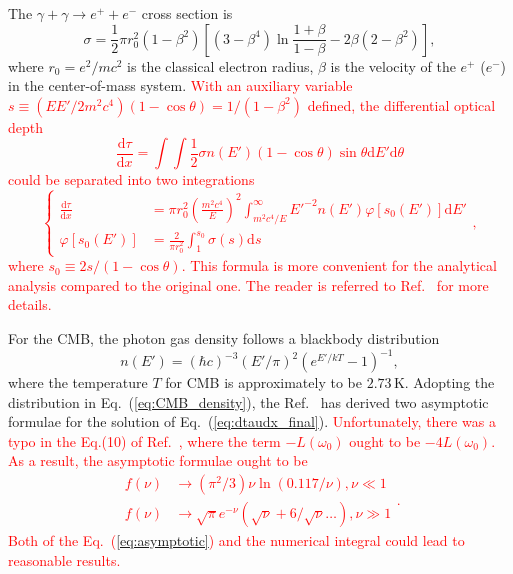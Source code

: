 \documentclass[12pt,aps,prd,amsmath,amssymb,showpacs,floats,floatfix,nofootinbib]{revtex4-1}
\def\red#1{{\textcolor{red}{#1}}} %
\begin{document}
The $\gamma+\gamma\rightarrow e^++e^-$ cross section is
\begin{equation}
  \sigma = \frac{1}{2}\pi r_0^2(1-\beta^2)\left[ (3-\beta^4)\ln\frac{1+\beta}{1-\beta}-2\beta(2-\beta^2) \right],
  \label{eq:cross_section}
\end{equation}
where $r_0=e^2/mc^2$ is the classical electron radius, $\beta$ is the velocity of the $e^+$ ($e^-$)  in the center-of-mass system.
\red{
  With an auxiliary variable $s\equiv (EE'/2m^2c^4)(1-\cos\theta)=1/(1-\beta^2)$ defined, the differential optical depth
\begin{equation}
  \frac{\mathrm{d}\tau}{\mathrm{d}x}=\int\int\frac{1}{2}\sigma n(E')(1-\cos\theta)\sin\theta\mathrm{d}E'\mathrm{d}\theta
  \label{eq:dtaudx}
\end{equation}
could be separated into two integrations
  \begin{equation}
    \left\{
      \begin{aligned}
        \frac{\mathrm{d}\tau}{\mathrm{d}x}&=\pi r_0^2\left( \frac{m^2c^4}{E} \right)^2\int^\infty_{m^2c^4/E}E'^{-2}n(E')\varphi\left[ s_0(E') \right]\mathrm{d}E'\\
        \varphi\left[ s_0(E') \right] &= \frac{2}{\pi r_0^2}\int_{1}^{s_0}\sigma(s)\mathrm{d}s
    \end{aligned}\right.,
  \label{eq:dtaudx_final}
  \end{equation}
  where $s_0\equiv 2s/(1-\cos\theta)$. This formula is more convenient for the analytical analysis compared to the original one. The reader is referred to Ref.~\cite{Gould:1967zzb} for more details.
}

For the CMB, the photon gas density follows a blackbody distribution
\begin{equation}
  n(E') = (\hbar c)^{-3}(E'/\pi)^2\left( e^{E'/kT}-1 \right)^{-1},
  \label{eq:CMB_density}
\end{equation}
where the temperature $T$ for CMB is approximately to be $2.73\,\mathrm{K}$.
Adopting the distribution in Eq.~(\ref{eq:CMB_density}), the Ref.~\cite{Gould:1967zzb} has derived two asymptotic formulae for the solution of Eq.~(\ref{eq:dtaudx_final}).
\red{Unfortunately, there was a typo in the Eq.(10) of Ref.~\cite{Gould:1967zzb}, where the term $-L(\omega_0)$ ought to be $-4L(\omega_0)$.
  As a result, the asymptotic formulae ought to be
  \begin{equation}
    \begin{aligned}
      f(\nu)&\rightarrow(\pi^2/3)\nu\ln(0.117/\nu), \nu\ll1 \\
      f(\nu)&\rightarrow\sqrt{\pi}e^{-\nu}(\sqrt{\nu}+6/\sqrt{\nu}\dots), \nu\gg1
    \end{aligned}.
    \label{eq:asymptotic}
  \end{equation}
  Both of the Eq.~(\ref{eq:asymptotic}) and the numerical integral could lead to reasonable results.
}
\end{document}
